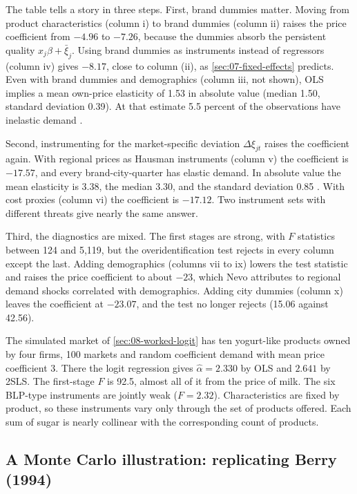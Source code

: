 The table tells a story in three steps. First, brand dummies matter. Moving from product characteristics (column i)
to brand dummies (column ii) raises the price coefficient from $-4.96$ to $-7.26$, because the dummies absorb the
persistent quality $x_j\beta + \bar\xi_j$. Using brand dummies as instruments instead of regressors (column iv) gives
$-8.17$, close to column (ii), as \cref{sec:07-fixed-effects} predicts. Even with brand dummies and demographics
(column iii, not shown), OLS implies a mean own-price elasticity of 1.53 in absolute value (median 1.50, standard
deviation 0.39). At that estimate 5.5 percent of the observations have inelastic demand \citep[p.~323]{Nevo2001}.

Second, instrumenting for the market-specific deviation $\Delta\xi_{jt}$ raises the coefficient again. With regional
prices as Hausman instruments (column v) the coefficient is $-17.57$, and every brand-city-quarter has elastic demand.
In absolute value the mean elasticity is 3.38, the median 3.30, and the standard deviation 0.85
\citep[p.~325]{Nevo2001}. With cost proxies (column vi) the coefficient is $-17.12$. Two instrument sets with
different threats give nearly the same answer.

Third, the diagnostics are mixed. The first stages are strong, with $F$ statistics between 124 and 5,119, but the
overidentification test rejects in every column except the last. Adding demographics (columns vii to ix) lowers the
test statistic and raises the price coefficient to about $-23$, which Nevo attributes to regional demand shocks
correlated with demographics. Adding city dummies (column x) leaves the coefficient at $-23.07$, and the test no longer
rejects (15.06 against 42.56).

The simulated market of \cref{sec:08-worked-logit} has ten yogurt-like products owned by four firms, 100 markets and
random coefficient demand with mean price coefficient 3. There the logit regression gives $\hat\alpha = 2.330$ by OLS
and $2.641$ by 2SLS. The first-stage $F$ is 92.5, almost all of it from the price of milk. The six BLP-type
instruments are jointly weak ($F = 2.32$). Characteristics are fixed by product, so these instruments vary only
through the set of products offered. Each sum of sugar is nearly collinear with the corresponding count of products.

\subsection{A Monte Carlo illustration: replicating Berry (1994)}\label{sec:07-montecarlo}

